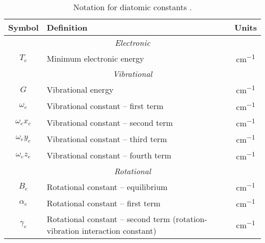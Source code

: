 \documentclass[11pt, twoside, fleqn]{report}
\begin{document}
    \begin{table}[H]
        \centering
        \caption{Notation for diatomic constants \cite{herzberg:diatomic,nist:sigma1,nist:sigma3}.}
        \label{t:notation}
        \begin{tabular}{clc}
            \toprule
            Symbol            & Definition                                                                   & Units            \\
            \midrule
            \multicolumn{3}{c}{\textit{Electronic}}                                                                             \\
            \cmidrule(lr){1-3}
            $T_e$           & Minimum electronic energy                                                    & \unit{cm^{-1}}   \\
            \multicolumn{3}{c}{\textit{Vibrational}}                                                                            \\
            \cmidrule(lr){1-3}
            $G$               & Vibrational energy                                                           & \unit{cm^{-1}}   \\
            $\omega_e$      & Vibrational constant -- first term                                           & \unit{cm^{-1}}   \\
            $\omega_ex_e$ & Vibrational constant -- second term                                          & \unit{cm^{-1}}   \\
            $\omega_ey_e$ & Vibrational constant -- third term                                           & \unit{cm^{-1}}   \\
            $\omega_ez_e$ & Vibrational constant -- fourth term                                          & \unit{cm^{-1}}   \\
            \multicolumn{3}{c}{\textit{Rotational}}                                                                             \\
            \cmidrule(lr){1-3}
            $B_e$           & Rotational constant -- equilibrium                                           & \unit{cm^{-1}}   \\
            $\alpha_e$      & Rotational constant -- first term                                            & \unit{cm^{-1}}   \\
            $\gamma_e$      & Rotational constant -- second term (rotation-vibration interaction constant) & \unit{cm^{-1}}   \\

\end{tabular}
\end{table}
\end{document}
